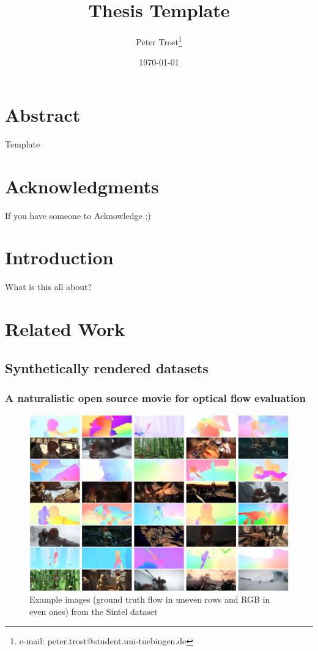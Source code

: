 \documentclass[a4paper,cleardoubleempty,BCOR1cm]{scrbook}
\title{Thesis Template}
\author{Peter Trost\thanks{e-mail: peter.trost@student.uni-tuebingen.de}}
\date{\today}
\begin{document}


\chapter*{Abstract}
Template

\chapter*{Acknowledgments}
If you have someone to Acknowledge ;)

\tableofcontents


\chapter{Introduction}
What is this all about?


\chapter{Related Work}
\section{Synthetically rendered datasets}
\subsection{A naturalistic open source movie for optical flow evaluation}
\cite{Butler:ECCV:2012}

\begin{figure}[h]
	\centering
	\includegraphics[width=\textwidth]{images/sintel_images.png}
	\caption{Example images (ground truth flow in uneven rows and RGB in even ones) from the Sintel dataset}
	\label{Sintel}
\end{figure}
\end{document}

